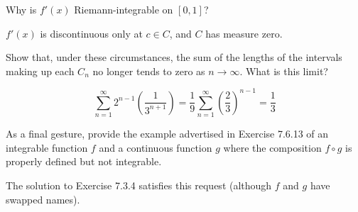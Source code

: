 \begin{exercise}
Why is \(f'(x)\) Riemann-integrable on \([0,1]\)?
\end{exercise}
\begin{solution}
\(f'(x)\) is discontinuous only at \(c \in C\), and \(C\) has measure zero.
\end{solution}

\begin{exercise}
Show that, under these circumstances, the sum of the lengths of the intervals making up each \(C_n\) no longer tends to zero as \(n \to \infty\). What is this limit?
\end{exercise}
\begin{solution}
\[\sum^\infty_{n=1} 2^{n-1} \left(\frac{1}{3^{n+1}}\right) = \frac{1}{9}\sum^\infty_{n=1} \left(\frac{2}{3}\right)^{n-1} = \frac{1}{3}\]
\end{solution}

\begin{exercise}
As a final gesture, provide the example advertised in Exercise 7.6.13 of an integrable function \(f\) and a continuous function \(g\) where the composition \(f \circ g\) is properly defined but not integrable.
\end{exercise}
\begin{solution}
The solution to Exercise 7.3.4 satisfies this request (although \(f\) and \(g\) have swapped names).
\end{solution}
